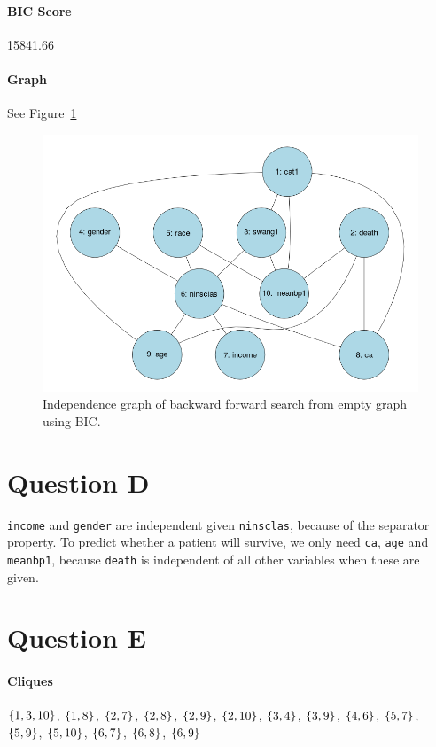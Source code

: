 \documentclass[12pt]{article}
\theoremstyle{definition}
\begin{document}
\paragraph{BIC Score} 15841.66

\paragraph{Graph} See Figure~\ref{fig:c}

\begin{figure}[H]
    \centering
    \includegraphics[width=0.8\linewidth]{c.png}
    \caption{Independence graph of backward forward search from empty graph using BIC.}
\label{fig:c}
\end{figure}

\section*{Question D}
\texttt{income} and \texttt{gender} are independent given \texttt{ninsclas}, because of the separator property.
To predict whether a patient will survive, we only need \texttt{ca}, \texttt{age} and \texttt{meanbp1}, because
\texttt{death} is independent of all other variables when these are given.

\section*{Question E}
\paragraph{Cliques}
$\set{1,3,10}$, $\set{1,8}$, $\set{2,7}$, $\set{2,8}$, $\set{2,9}$, $\set{2,10}$,
$\set{3,4}$, $\set{3,9}$, $\set{4,6}$, $\set{5,7}$, $\set{5,9}$, $\set{5,10}$,
$\set{6,7}$, $\set{6,8}$, $\set{6,9}$
\end{document}
